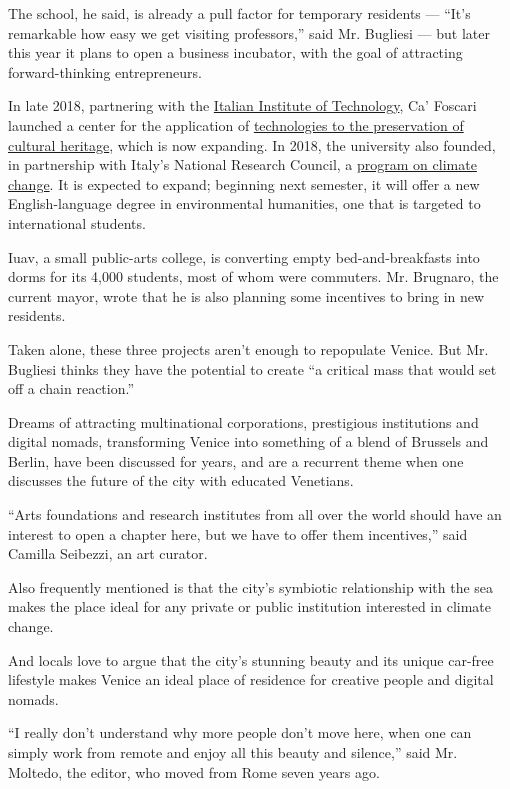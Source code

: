 The school, he said, is already a pull factor for temporary residents
--- ``It's remarkable how easy we get visiting professors,'' said Mr.
Bugliesi --- but later this year it plans to open a business incubator,
with the goal of attracting forward-thinking entrepreneurs.

In late 2018, partnering with the \href{https://www.iit.it/}{Italian
Institute of Technology}, Ca' Foscari launched a center for the
application of \href{https://ccht.iit.it/}{technologies to the
preservation of cultural heritage}, which is now expanding. In 2018, the
university also founded, in partnership with Italy's National Research
Council, a \href{https://www.cmcc.it/it/cmcccafoscari}{program on
climate change}. It is expected to expand; beginning next semester, it
will offer a new English-language degree in environmental humanities,
one that is targeted to international students.

Iuav, a small public-arts college, is converting empty
bed-and-breakfasts into dorms for its 4,000 students, most of whom were
commuters. Mr. Brugnaro, the current mayor, wrote that he is also
planning some incentives to bring in new residents.

Taken alone, these three projects aren't enough to repopulate Venice.
But Mr. Bugliesi thinks they have the potential to create ``a critical
mass that would set off a chain reaction.''

Dreams of attracting multinational corporations, prestigious
institutions and digital nomads, transforming Venice into something of a
blend of Brussels and Berlin, have been discussed for years, and are a
recurrent theme when one discusses the future of the city with educated
Venetians.

``Arts foundations and research institutes from all over the world
should have an interest to open a chapter here, but we have to offer
them incentives,'' said Camilla Seibezzi, an art curator.

Also frequently mentioned is that the city's symbiotic relationship with
the sea makes the place ideal for any private or public institution
interested in climate change.

And locals love to argue that the city's stunning beauty and its unique
car-free lifestyle makes Venice an ideal place of residence for creative
people and digital nomads.

``I really don't understand why more people don't move here, when one
can simply work from remote and enjoy all this beauty and silence,''
said Mr. Moltedo, the editor, who moved from Rome seven years ago.

